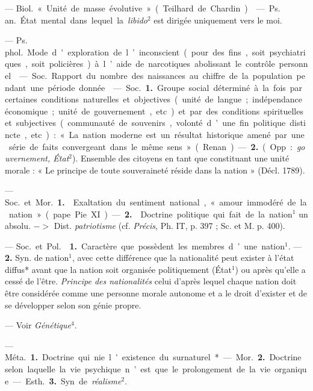 
	\begin{itemize}[leftmargin=1cm, label=, itemsep=1pt]

 — \si{Biol.} « Unité de masse évolutive » (Teilhard de Chardin).

 — \si{Ps. an.} État mental dans lequel la {\it libido}$^2$
est dirigée uniquement vers le moi.

 — \si{Ps. phol.} Mode d'exploration de l’inconscient (pour
des fins, soit psychiatriques, soit
policières) à l’aide de narcotiques abolissant le contrôle personnel.

 — \si{Soc.} Rapport du nombre des naissances au chiffre de la
population pendant une période donnée.

 — \si{Soc.} {\bf 1.} Groupe social déterminé à la fois par
certaines conditions naturelles et objectives (unité de langue ; indépendance
économique ; unité de gouvernement, etc.) et par des conditions spirituelles
et subjectives (communauté de souvenirs, volonté d’une fin politique
distincte, etc.) : « La nation moderne est un résultat historique amené par
une série de faits convergeant dans le même sens » (Renan). — {\bf 2.}
(Opp. : {\it gouvernement, État}$^2$). Ensemble des citoyens en tant
que constituant une unité morale : « Le principe de toute souveraineté réside
dans la nation » (Décl. 1789).

 — \si{Soc.} et \si{Mor.} {\bf 1.} 
Exaltation du sentiment national, « amour immodéré de la nation » (pape Pie
XI). — {\bf 2.}  Doctrine politique qui fait de la nation$^1$
un absolu. $->$ Dist. {\it patriotisme} (cf. {\it Précis}, Ph. IT, p.
397 ; Sc. et M. p. 400).

 — \si{Soc.} et \si{Pol.}  {\bf 1.} Caractère
que possèdent les membres d’une nation$^1$. —  {\bf 2.} Syn.
de nation$^1$, avec cette différence que la nationalité peut exister à l’état
diffus* avant que la nation soit organisée politiquement (État$^1$) ou après
qu’elle a cessé de l’être. {\it Principe des nationalités} celui d’après
lequel chaque nation doit être considérée comme une personne morale autonome
et a le droit d’exister et de se développer selon son génie propre.

 — Voir {\it Génétique}$^4$.

 —  \si{Méta.} {\bf 1.} Doctrine qui nie
l'existence du surnaturel*. — \si{Mor.} {\bf 2.} Doctrine selon laquelle la
vie psychique n’est que le prolongement de la vie organique. — \si{Esth.}
{\bf 3.} Syn. de {\it réalisme}$^2$.


\end{itemize}
